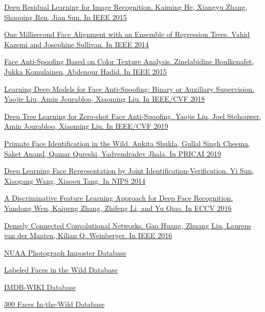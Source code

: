 \begin{thebibliography}{0}
    \hypertarget{resnet}{}
    \href{https://arxiv.org/abs/1512.03385}
    {Deep Residual Learning for Image Recognition.
    Kaiming He, Xiangyu Zhang, Shaoqing Ren, Jian Sun.
    In IEEE 2015}

    \hypertarget{align}{}
    \href{http://www.csc.kth.se/~vahidk/papers/KazemiCVPR14.pdf}
    {One Millisecond Face Alignment with an Ensemble of Regression Trees.
    Vahid Kazemi and Josephine Sullivan.
    In IEEE 2014}

    \hypertarget{lpb}{}
    \href{https://arxiv.org/abs/1511.06316}
    {Face Anti-Spoofing Based on Color Texture Analysis.
    Zinelabidine Boulkenafet, Jukka Komulainen, Abdenour Hadid.
    In IEEE 2015}

    \hypertarget{lpb2}{}
    \href{https://arxiv.org/abs/1803.11097}
    {Learning Deep Models for Face Anti-Spoofing: Binary or Auxiliary Supervision.
    Yaojie Liu, Amin Jourabloo, Xiaoming Liu.
    In IEEE/CVF 2018}

    \hypertarget{lpb3}{}
    \href{https://arxiv.org/abs/1904.02860}
    {Deep Tree Learning for Zero-shot Face Anti-Spoofing.
    Yaojie Liu, Joel Stehouwer, Amin Jourabloo, Xiaoming Liu.
    In IEEE/CVF 2019}

    \hypertarget{pfid}{}
    \href{https://arxiv.org/abs/1907.02642}
    {Primate Face Identification in the Wild.
    Ankita Shukla, Gullal Singh Cheema, Saket Anand, Qamar Qureshi, Yadvendradev Jhala.
    In PRICAI 2019}

    \hypertarget{pfid2}{}
    \href{https://arxiv.org/abs/1406.4773}
    {Deep Learning Face Representation by Joint Identification-Verification.
    Yi Sun, Xiaogang Wang, Xiaoou Tang.
    In NIPS 2014}

    \hypertarget{pfid3}{}
    \href{https://ydwen.github.io/papers/WenECCV16.pdf}
    {A Discriminative Feature Learning Approach for Deep Face Recognition.
    Yandong Wen, Kaipeng Zhang, Zhifeng Li, and Yu Qiao.
    In ECCV 2016}

    \hypertarget{densenet}{}
    \href{https://arxiv.org/abs/1608.06993}
    {Densely Connected Convolutional Networks.
    Gao Huang, Zhuang Liu, Laurens van der Maaten, Kilian Q. Weinberger.
    In IEEE 2016}

    \hypertarget{NUAA}{}
    \href{http://parnec.nuaa.edu.cn/xtan/data/nuaaimposterdb.html}
    {NUAA Photograph Imposter Database}

    \hypertarget{lfw}{}
    \href{http://vis-www.cs.umass.edu/lfw/}
    {Labeled Faces in the Wild Database}

    \hypertarget{IMDB-WIKI}{}
    \href{https://data.vision.ee.ethz.ch/cvl/rrothe/imdb-wiki/}
    {IMDB-WIKI Database}

    \hypertarget{bug}{}
    \href{https://ibug.doc.ic.ac.uk/resources/300-W/}
    {300 Faces In-the-Wild Database}

\end{thebibliography}